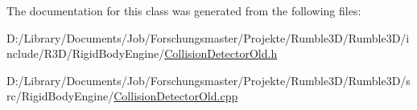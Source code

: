 The documentation for this class was generated from the following files\+:\begin{DoxyCompactItemize}
\item 
D\+:/\+Library/\+Documents/\+Job/\+Forschungsmaster/\+Projekte/\+Rumble3\+D/\+Rumble3\+D/include/\+R3\+D/\+Rigid\+Body\+Engine/\mbox{\hyperlink{_collision_detector_old_8h}{Collision\+Detector\+Old.\+h}}\item 
D\+:/\+Library/\+Documents/\+Job/\+Forschungsmaster/\+Projekte/\+Rumble3\+D/\+Rumble3\+D/src/\+Rigid\+Body\+Engine/\mbox{\hyperlink{_collision_detector_old_8cpp}{Collision\+Detector\+Old.\+cpp}}\end{DoxyCompactItemize}
